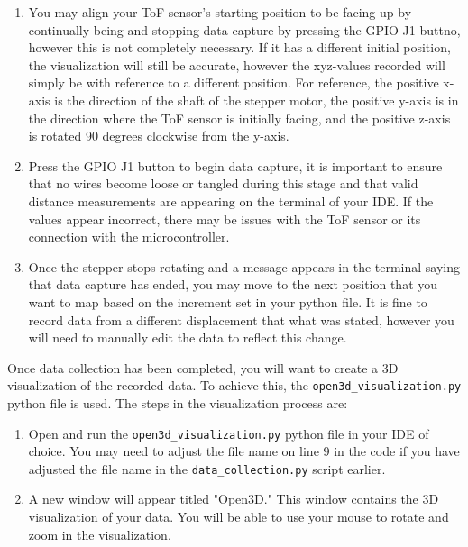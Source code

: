 \documentclass[12pt]{article}
\begin{document}
\begin{enumerate}
    \item You may align your ToF sensor's starting position to be facing up by continually being and stopping data capture by pressing the GPIO J1 buttno, however this is not completely necessary. If it has a different initial position, the visualization will still be accurate, however the xyz-values recorded will simply be with reference to a different position. For reference, the positive x-axis is the direction of the shaft of the stepper motor, the positive y-axis is in the direction where the ToF sensor is initially facing, and the positive z-axis is rotated 90 degrees clockwise from the y-axis. 
    \item Press the GPIO J1 button to begin data capture, it is important to ensure that no wires become loose or tangled during this stage and that valid distance measurements are appearing on the terminal of your IDE. If the values appear incorrect, there may be issues with the ToF sensor or its connection with the microcontroller.
    \item Once the stepper stops rotating and a message appears in the terminal saying that data capture has ended, you may move to the next position that you want to map based on the increment set in your python file. It is fine to record data from a different displacement that what was stated, however you will need to manually edit the data to reflect this change.
\end{enumerate}
Once data collection has been completed, you will want to create a 3D visualization of the recorded data. To achieve this, the \texttt{open3d\_visualization.py} python file is used. The steps in the visualization process are:
\begin{enumerate}
    \item Open and run the \texttt{open3d\_visualization.py} python file in your IDE of choice. You may need to adjust the file name on line 9 in the code if you have adjusted the file name in the \texttt{data\_collection.py} script earlier.
    \item A new window will appear titled "Open3D." This window contains the 3D visualization of your data. You will be able to use your mouse to rotate and zoom in the visualization.
\end{enumerate}
\end{document}
